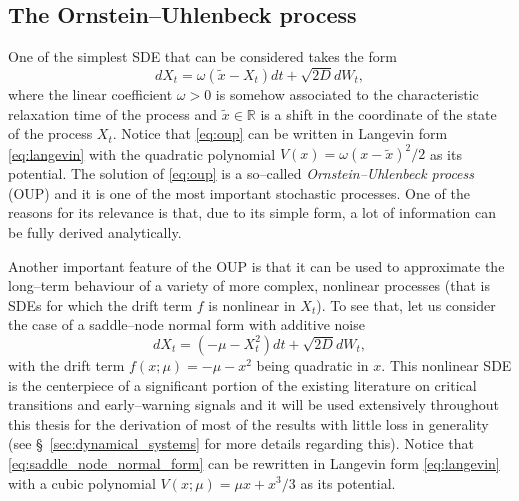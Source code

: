 \subsection{The Ornstein--Uhlenbeck process}\label{subsec:oup}
One of the simplest SDE that can be considered takes the form 
%
\begin{equation}\label{eq:oup}
  dX_{t} = \omega(\tilde{x} - X_{t})dt + \sqrt{2D}dW_{t},
\end{equation}
%
where the linear coefficient $\omega>0$ is somehow associated to the characteristic relaxation time of the process and $\tilde{x}\in\mathbb{R}$ is a shift in the coordinate of the state of the process $X_t$.
Notice that \eqref{eq:oup} can be written in Langevin form \eqref{eq:langevin} with the quadratic polynomial $V(x) = \omega(x - \tilde{x})^2/2$ as its potential. 
The solution of \eqref{eq:oup} is a so--called \emph{Ornstein--Uhlenbeck process} (OUP) and it is one of the most important stochastic processes.
One of the reasons for its relevance is that, due to its simple form, a lot of information can be fully derived analytically.


Another important feature of the OUP is that it can be used to approximate the long--term behaviour of a variety of more complex, nonlinear processes (that is SDEs for which the drift term $f$ is nonlinear in $X_t$).
To see that, let us consider the case of a saddle--node normal form with additive noise
%
\begin{equation}\label{eq:saddle_node_normal_form}
  dX_{t} = (-\mu-X_{t}^{2})dt + \sqrt{2D}dW_{t},
\end{equation}
%
with the drift term $f(x;\mu) = -\mu - x^2$ being quadratic in $x$.
This nonlinear SDE is the centerpiece of a significant portion of the existing literature on critical transitions and early--warning signals and it will be used extensively throughout this thesis for the derivation of most of the results with little loss in generality (see \S~\ref{sec:dynamical_systems} for more details regarding this).
Notice that \eqref{eq:saddle_node_normal_form} can be rewritten in Langevin form \eqref{eq:langevin} with a cubic polynomial $V(x;\mu) = \mu x + x^3/3$ as its potential.

